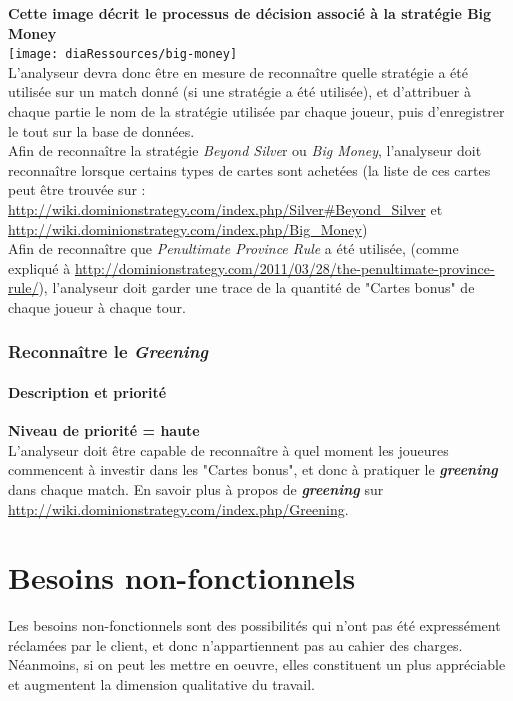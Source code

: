 \textbf{Cette image décrit le processus de décision associé à la stratégie Big Money}\\
\texttt{[image: diaRessources/big-money]}\\
L'analyseur devra donc être en mesure de reconnaître quelle stratégie a été utilisée sur un match donné (si une  stratégie a été utilisée), et d'attribuer à chaque partie le nom de la stratégie utilisée par chaque joueur, puis d'enregistrer le tout sur la base de données.\\


Afin de reconnaître la stratégie \textit{Beyond Silve}r ou \textit{Big Money}, l'analyseur doit reconnaître lorsque certains types de cartes sont achetées (la liste de ces cartes peut être trouvée sur : \url{http://wiki.dominionstrategy.com/index.php/Silver#Beyond_Silver} et \url{http://wiki.dominionstrategy.com/index.php/Big_Money})\\

Afin de reconnaître que \textit{Penultimate Province Rule} a été utilisée, (comme expliqué à \url{http://dominionstrategy.com/2011/03/28/the-penultimate-province-rule/}), l’analyseur doit garder une trace de la quantité de "Cartes bonus" de chaque joueur à chaque tour.

\subsubsection{Reconnaître le \textit{Greening}}
\paragraph*{Description et priorité}
\textbf{Niveau de priorité = haute}\\

L'analyseur doit être capable de reconnaître à quel moment les joueures commencent à investir dans les "Cartes bonus", et donc à pratiquer le \textit{\textbf{greening}} dans chaque match.
En savoir plus à propos de \textit{\textbf{greening}} sur \url{http://wiki.dominionstrategy.com/index.php/Greening}.\\ 

\newpage

\section{Besoins non-fonctionnels}
Les besoins non-fonctionnels sont des possibilités qui n'ont pas été expressément réclamées par le client, et donc n'appartiennent pas au cahier des charges. Néanmoins, si on peut les mettre en oeuvre, elles constituent un plus appréciable et augmentent la dimension qualitative du travail.

